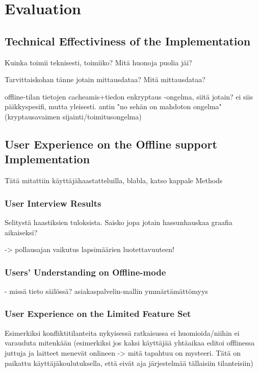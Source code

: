 \chapter{Evaluation}


\section{Technical Effectiviness of the Implementation}


Kuinka toimii teknisesti, toimiiko? Mitä huonoja puolia jäi?

Tarvittaiskohan tänne jotain mittausdataa? Mitä mittausdataa?

offline-tilan tietojen cacheamis+tiedon enkryptaus -ongelma, siitä jotain? ei siis päikkyspesifi, mutta yleisesti. antin "no sehän on mahdoton ongelma" (kryptausavaimen sijainti/toimitusongelma)
 



\section{User Experience on the Offline support Implementation}
Tätä mitattiin käyttäjähaastatteluilla, blabla, katso kappale Methods

\subsection{User Interview Results}
Selitystä haastiksien tuloksista. Saisko jopa jotain hassunhauskaa graafia aikaiseksi?

-> pollausajan vaikutus lapsimäärien luotettavuuteen!


\subsection{Users' Understanding on Offline-mode}
- missä tieto säilössä? asiakaspalvelin-mallin ymmärtämättömyys



\subsection{User Experience on the Limited Feature Set}
Esimerkiksi konfliktitilanteita nykyisessä ratkaisussa ei huomioida/niihin ei varauduta mitenkään (esimerkiksi jos kaksi käyttäjää yhtäaikaa editoi offlinessa juttuja ja laitteet menevät onlineen -> mitä tapahtuu on mysteeri. Tätä on paikattu käyttäjäkoulutuksella, että eivät aja järjestelmää tällaisiin tilanteisiin) 

